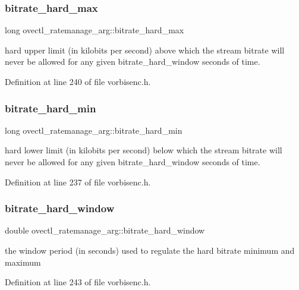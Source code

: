 \subsubsection{\texorpdfstring{bitrate\_hard\_max}{bitrate\_hard\_max}}
{\footnotesize\ttfamily long ovectl\+\_\+ratemanage\+\_\+arg\+::bitrate\+\_\+hard\+\_\+max}

hard upper limit (in kilobits per second) above which the stream bitrate will never be allowed for any given bitrate\+\_\+hard\+\_\+window seconds of time. 

Definition at line 240 of file vorbisenc.\+h.

\mbox{\label{structovectl__ratemanage__arg_a449d3ea8d0645742af859dd17b41fbfb}} 
\subsubsection{\texorpdfstring{bitrate\_hard\_min}{bitrate\_hard\_min}}
{\footnotesize\ttfamily long ovectl\+\_\+ratemanage\+\_\+arg\+::bitrate\+\_\+hard\+\_\+min}

hard lower limit (in kilobits per second) below which the stream bitrate will never be allowed for any given bitrate\+\_\+hard\+\_\+window seconds of time. 

Definition at line 237 of file vorbisenc.\+h.

\mbox{\label{structovectl__ratemanage__arg_a68caf36fc02a52199705fa331d118446}} 
\subsubsection{\texorpdfstring{bitrate\_hard\_window}{bitrate\_hard\_window}}
{\footnotesize\ttfamily double ovectl\+\_\+ratemanage\+\_\+arg\+::bitrate\+\_\+hard\+\_\+window}

the window period (in seconds) used to regulate the hard bitrate minimum and maximum 

Definition at line 243 of file vorbisenc.\+h.

